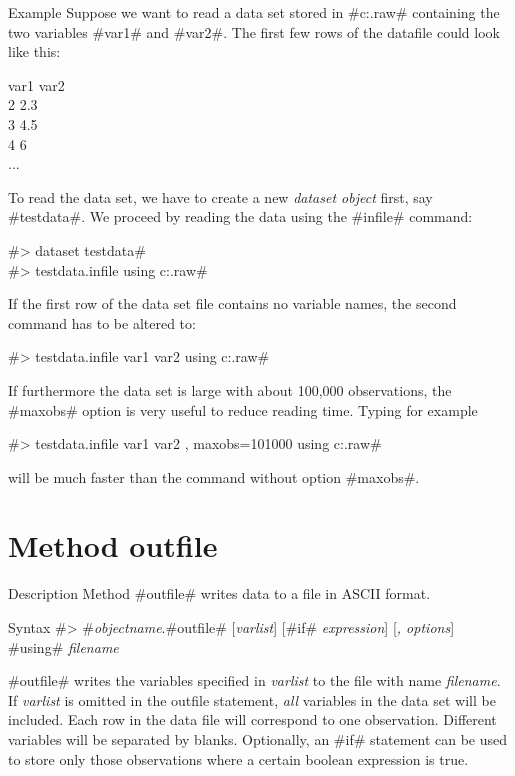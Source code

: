 \begin{stanza}{Example}
Suppose we want to read a data set stored in #c:\data\testdata.raw# containing the two variables #var1# and #var2#. The first few rows of the datafile could look like this:

var1 var2 \\
2 2.3 \\
3 4.5 \\
4 6 \\
...

To read the data set, we have to create a new {\em dataset object} first, say #testdata#. We proceed by reading the data using the #infile# command:

#> dataset testdata# \\
#> testdata.infile using c:\data\testdata.raw#

If the first row of the data set file contains no variable names, the second command has to be altered to:

#> testdata.infile var1 var2 using c:\data\testdata.raw#

If furthermore the data set is large with about 100,000 observations, the #maxobs# option is very useful to
reduce reading time. Typing for example

#> testdata.infile var1 var2 , maxobs=101000 using c:\data\testdata.raw#

will be much faster than the command without option #maxobs#.
\end{stanza}


\section{Method outfile}
 \label{outfile} 

\begin{stanza}{Description}
Method #outfile# writes data to a file in ASCII format.
\end{stanza}

\begin{stanza}{Syntax}
#> #{\em objectname}.#outfile# [{\em varlist}] [#if# {\em expression}] [{\em , options}] #using# {\em filename}

#outfile# writes the variables specified in {\em varlist} to the file with name {\em filename}. If {\em varlist} is omitted in the outfile statement, {\em all} variables in the data set will be included. Each row in the data file will correspond to one observation. Different variables will be separated by blanks. Optionally, an #if# statement can be used to store only those observations where a certain boolean expression is true.
\end{stanza}

